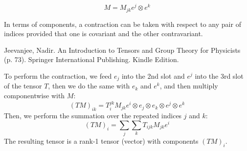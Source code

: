 $$
M = M_{jk} e^j \otimes e^k
$$

In terms of components, a  contraction can be taken with respect to any pair of indices
provided that one is  covariant and the other contravariant.

Jeevanjee, Nadir. An Introduction to Tensors and Group Theory for Physicists (p. 73). Springer International Publishing. Kindle Edition. 

To perform the contraction, we feed $e_j$ into the 2nd slot and $e^j$ into the 3rd slot of the tensor $T$,
then we do the same with $e_k$ and $e^k$,
and then multiply componentwise with $M$:
$$
(TM)_{ik} = T_{i}^{jk} M_{jk} e^i \otimes e_j \otimes e_k \otimes e^j \otimes e^k
$$
Then, we perform the summation over the repeated indices $j$ and $k$:
$$
(TM)_i = \sum_j \sum_k T_{ijk} M_{jk} e^i
$$
The resulting tensor is a rank-1 tensor (vector) with components $(TM)_i$.

